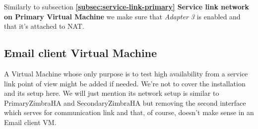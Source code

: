 Similarly to subsection \textbf{\ref{subsec:service-link-primary} Service link network on Primary Virtual Machine} we make sure that \textit{Adapter 3} is enabled and that it's attached to NAT.

\subsection {Email client Virtual Machine}
A Virtual Machine whose only purpose is to test high availability from a service link point of view might be added if needed. We're not to cover the installation and its setup here. We will just mention its network setup is similar to PrimaryZimbraHA and SecondaryZimbraHA but removing the second interface which serves for communication link and that, of course, doesn't make sense in an Email client VM.